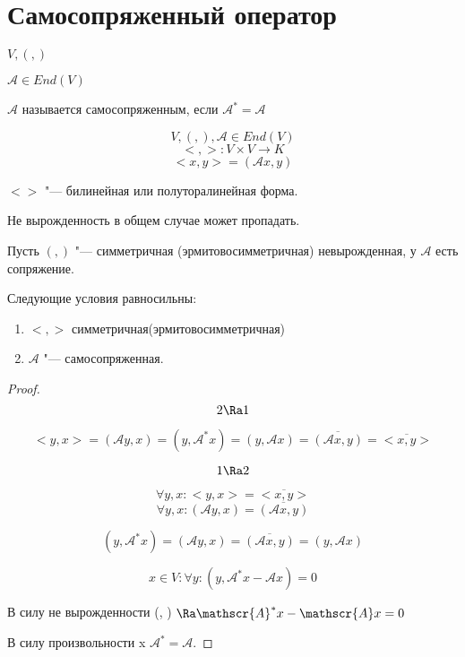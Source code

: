 \section{Самосопряженный оператор}
\begin{Def}
$V, (,)$

$\mathscr{A} \in End(V)$

$\mathscr{A}$ называется самосопряженным, если 
$\mathscr{A}^* = \mathscr{A}$
\end{Def}

$$V, (, ), \mathscr{A} \in End(V)$$
$$<, >\colon V \times V \to K $$
$$<x, y> = (\mathscr{A}x, y)$$

$< >$ "--- билинейная или полуторалинейная форма. 

Не вырожденность в общем случае может пропадать. 

\begin{theorem}{}
Пусть $(,)$ "--- симметричная (эрмитовосимметричная) невырожденная, у $\mathscr{A}$ есть сопряжение. 

Следующие условия равносильны:
    \begin{enumerate}
    \item $<, >$  симметричная(эрмитовосимметричная)
    \item $\mathscr{A}$  "--- самосопряженная.
    \end{enumerate} 
\end{theorem}

\begin{proof}
$$2 \Ra 1$$


$$<y, x>  = (\mathscr{A}y, x) = (y, \mathscr{A}^{*}x) = (y, \mathscr{A}x) = \overline{(\mathscr{A}x, y)} = \overline{<x, y>}$$

$$1 \Ra 2$$

$$\forall y, x \colon <y, x> = \overline{<x, y>}$$
$$\forall y, x \colon (\mathscr{A}y, x) = \overline{(\mathscr{A}x, y)}$$

$$(y, \mathscr{A}^*x) = (\mathscr{A}y, x) = \overline{(\mathscr{A}x, y)} = (y, \mathscr{A}x)$$

$$x \in V \colon \forall y \colon (y, \mathscr{A}^*x - \mathscr{A}x) = 0$$

В силу не вырожденности (, ) $\Ra \mathscr{A}^*x - \mathscr{A}x = 0$

В силу произвольности x $\mathscr{A}^* = \mathscr{A}$.
\end{proof}

